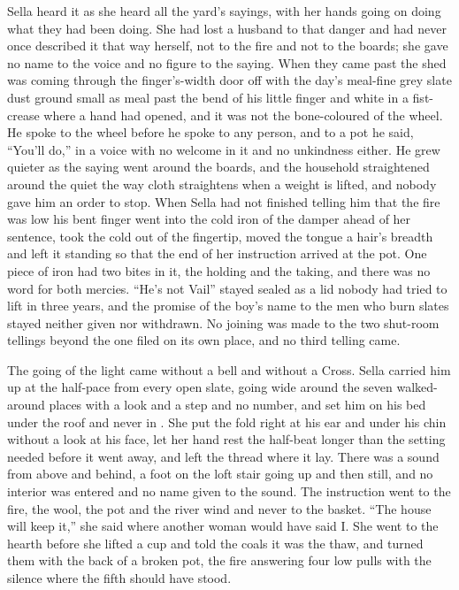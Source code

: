 Sella heard it as she heard all the yard's sayings, with her hands going on doing what they had been doing. She had lost a husband to that danger and had never once described it that way herself, not to the fire and not to the boards; she gave no name to the voice and no figure to the saying. When they came past the shed  was coming through the finger's-width door off  with the day's meal-fine grey slate dust ground small as meal past the bend of his little finger and white in a fist-crease where a hand had opened, and it was not the bone-coloured  of the wheel. He spoke to the wheel before he spoke to any person, and to a pot he said, “You'll do,” in a voice with no welcome in it and no unkindness either. He grew quieter as the saying went around the boards, and the household straightened around the quiet the way cloth straightens when a weight is lifted, and nobody gave him an order to stop. When Sella had not finished telling him that the fire was low his bent finger went into the cold iron of the damper ahead of her sentence, took the cold out of the fingertip, moved the tongue a hair's breadth and left it standing so that the end of her instruction arrived at the pot. One piece of iron had two bites in it, the holding and the taking, and there was no  word for both mercies. “He's not Vail” stayed sealed as a lid nobody had tried to lift in three years, and the promise of the boy's name to the men who burn slates stayed neither given nor withdrawn. No joining was made to the two shut-room tellings beyond the one filed on its own place, and no third telling came.

The going of the light came without a bell and without a Cross. Sella carried him up at the half-pace from every open slate, going wide around the seven walked-around places with a look and a step and no number, and set him on his bed under the roof and never in . She put the fold right at his ear and under his chin without a look at his face, let her hand rest the half-beat longer than the setting needed before it went away, and left the thread where it lay. There was a sound from above and behind, a foot on the loft stair going up and then still, and no interior was entered and no name given to the sound. The instruction went to the fire, the wool, the pot and the river wind and never to the basket. “The house will keep it,” she said where another woman would have said I. She went to the hearth before she lifted a cup and told the coals it was the thaw, and turned them with the back of a broken pot, the fire answering four low pulls with the silence where the fifth should have stood.

